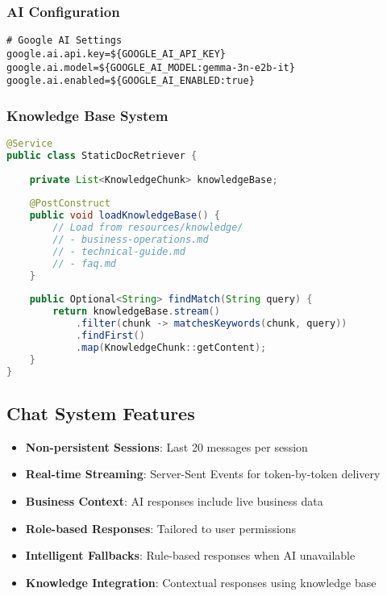 \documentclass[11pt,a4paper]{article}
\begin{document}
\subsubsection{AI Configuration}

\begin{lstlisting}[language=properties, caption=AI Configuration]
# Google AI Settings
google.ai.api.key=${GOOGLE_AI_API_KEY}
google.ai.model=${GOOGLE_AI_MODEL:gemma-3n-e2b-it}
google.ai.enabled=${GOOGLE_AI_ENABLED:true}
\end{lstlisting}

\subsubsection{Knowledge Base System}

\begin{lstlisting}[language=java, caption=Document Retrieval]
@Service
public class StaticDocRetriever {
    
    private List<KnowledgeChunk> knowledgeBase;
    
    @PostConstruct
    public void loadKnowledgeBase() {
        // Load from resources/knowledge/
        // - business-operations.md
        // - technical-guide.md  
        // - faq.md
    }
    
    public Optional<String> findMatch(String query) {
        return knowledgeBase.stream()
            .filter(chunk -> matchesKeywords(chunk, query))
            .findFirst()
            .map(KnowledgeChunk::getContent);
    }
}
\end{lstlisting}

\subsection{Chat System Features}

\begin{itemize}[leftmargin=*]
    \item \textbf{Non-persistent Sessions}: Last 20 messages per session
    \item \textbf{Real-time Streaming}: Server-Sent Events for token-by-token delivery
    \item \textbf{Business Context}: AI responses include live business data
    \item \textbf{Role-based Responses}: Tailored to user permissions
    \item \textbf{Intelligent Fallbacks}: Rule-based responses when AI unavailable
    \item \textbf{Knowledge Integration}: Contextual responses using knowledge base
\end{itemize}
\end{document}
